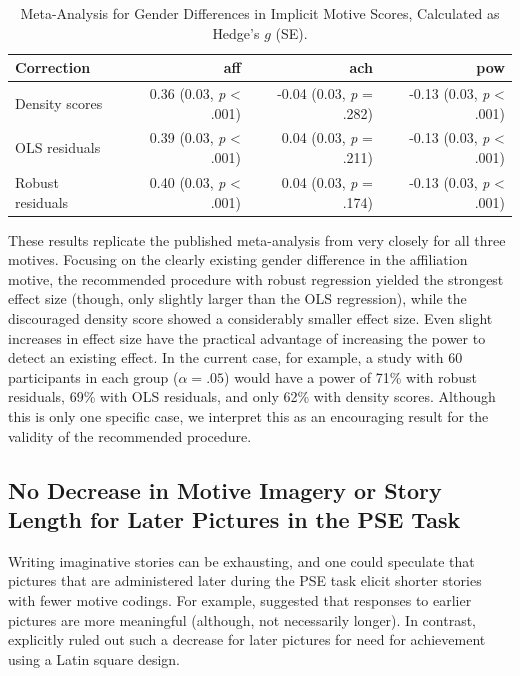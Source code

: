 \documentclass[jou,a4paper]{apa6}\usepackage[]{graphicx}\usepackage[]{color}
\begin{document}
\begin{table}
		\caption{Meta-Analysis for Gender Differences in Implicit Motive Scores, Calculated as Hedge's $g$ (SE).}
		\label{tab:MA}
		\footnotesize
		\begin{tabularx}{\textwidth}{lrrr}
		\toprule

Correction & aff & ach & pow \\ 
  \hline
Density scores & 0.36 (0.03, \emph{p} < .001) & -0.04 (0.03, \emph{p} = .282) & -0.13 (0.03, \emph{p} < .001) \\ 
  OLS residuals & 0.39 (0.03, \emph{p} < .001) & 0.04 (0.03, \emph{p} = .211) & -0.13 (0.03, \emph{p} < .001) \\ 
  Robust residuals & 0.40 (0.03, \emph{p} < .001) & 0.04 (0.03, \emph{p} = .174) & -0.13 (0.03, \emph{p} < .001) \\ 
   \hline

		\bottomrule
		\end{tabularx}
\end{table}



These results replicate the published meta-analysis from \textcite{drescher_MetaanalyticEvidenceHigher_2016} very closely for all three motives. Focusing on the clearly existing gender difference in the affiliation motive, the recommended procedure with robust regression yielded the strongest effect size (though, only slightly larger than the OLS regression), while the discouraged density score showed a considerably smaller effect size. Even slight increases in effect size have the practical advantage of increasing the power to detect an existing effect. In the current case, for example, a study with 60 participants in each group ($\alpha = .05$) would have a power of 71\% with robust residuals, 69\% with OLS residuals, and only 62\% with density scores. 
Although this is only one specific case, we interpret this as an encouraging result for the validity of the recommended procedure.

\subsection{No Decrease in Motive Imagery or Story Length for Later Pictures in the PSE Task}
Writing imaginative stories can be exhausting, and one could speculate that pictures that are administered later during the PSE task elicit shorter stories with fewer motive codings. For example, \textcite{smith_MethodologicalConsiderationsSteps_1992} suggested that responses to earlier pictures are more meaningful (although, not necessarily longer). In contrast, \textcite[][Table 7.1]{mcclelland_achievement_1953} explicitly ruled out such a decrease for later pictures for need for achievement using a Latin square design.
\end{document}
